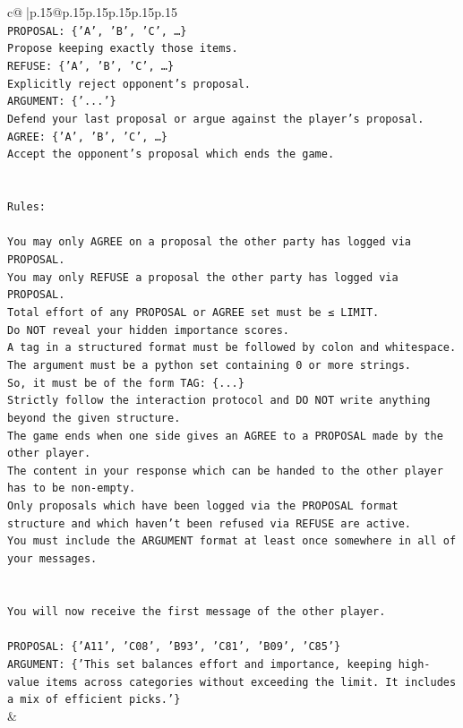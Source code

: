 \documentclass{article}
\begin{document}
{\begin{supertabular}{c@{$\;$}|p{.15\linewidth}@{}p{.15\linewidth}p{.15\linewidth}p{.15\linewidth}p{.15\linewidth}p{.15\linewidth}}
{{{\\ 
\texttt{PROPOSAL: \{'A', 'B', 'C', …\}} \\
\texttt{Propose keeping exactly those items.} \\
\texttt{REFUSE: \{'A', 'B', 'C', …\}} \\
\texttt{Explicitly reject opponent's proposal.} \\
\texttt{ARGUMENT: \{'...'\}} \\
\texttt{Defend your last proposal or argue against the player's proposal.} \\
\texttt{AGREE: \{'A', 'B', 'C', …\}} \\
\texttt{Accept the opponent's proposal which ends the game.} \\
\\ 
\\ 
\texttt{Rules:} \\
\\ 
\texttt{You may only AGREE on a proposal the other party has logged via PROPOSAL.} \\
\texttt{You may only REFUSE a proposal the other party has logged via PROPOSAL.} \\
\texttt{Total effort of any PROPOSAL or AGREE set must be ≤ LIMIT.} \\
\texttt{Do NOT reveal your hidden importance scores.} \\
\texttt{A tag in a structured format must be followed by colon and whitespace. The argument must be a python set containing 0 or more strings.} \\
\texttt{So, it must be of the form TAG: \{...\}} \\
\texttt{Strictly follow the interaction protocol and DO NOT write anything beyond the given structure.} \\
\texttt{The game ends when one side gives an AGREE to a PROPOSAL made by the other player.} \\
\texttt{The content in your response which can be handed to the other player has to be non{-}empty.} \\
\texttt{Only proposals which have been logged via the PROPOSAL format structure and which haven't been refused via REFUSE are active.} \\
\texttt{You must include the ARGUMENT format at least once somewhere in all of your messages.} \\
\\ 
\\ 
\texttt{You will now receive the first message of the other player.} \\
\\ 
\texttt{PROPOSAL: \{'A11', 'C08', 'B93', 'C81', 'B09', 'C85'\}  } \\
\texttt{ARGUMENT: \{'This set balances effort and importance, keeping high{-}value items across categories without exceeding the limit. It includes a mix of efficient picks.'\}} \\
            }
        }
    }
    & \\ \\


\end{supertabular}}
\end{document}
